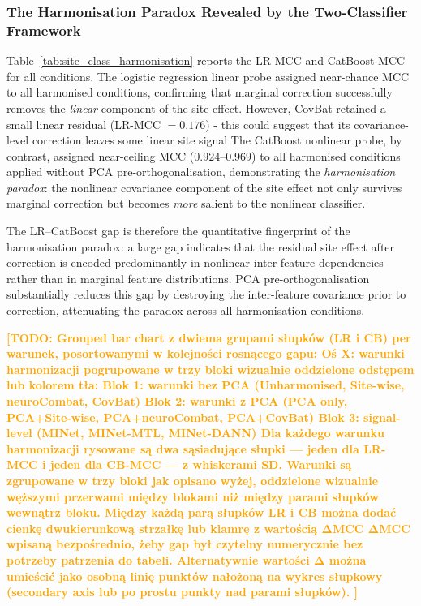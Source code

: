 \documentclass[preprint,12pt]{elsarticle}
\newcommand{\td}[1]{\textcolor{orange}{\textbf{[TODO: #1]}}}
\begin{document}
\subsubsection{The Harmonisation Paradox Revealed by the
  Two-Classifier Framework}
\label{subsubsec:paradox}

Table~\ref{tab:site_class_harmonisation} reports the LR-MCC and
CatBoost-MCC for all conditions.
The logistic regression linear probe assigned near-chance MCC to all
harmonised conditions, confirming that marginal correction
successfully removes the \emph{linear} component of the site effect. However, CovBat retained a small linear residual (LR-MCC $= 0.176$) - this could suggest that its covariance-level correction leaves some linear site signal
The CatBoost nonlinear probe, by contrast, assigned near-ceiling MCC
($0.924$--$0.969$) to all harmonised conditions applied without PCA
pre-orthogonalisation, demonstrating the \emph{harmonisation paradox}:
the nonlinear covariance component of the site effect not only
survives marginal correction but becomes \emph{more} salient to the
nonlinear classifier.

The LR--CatBoost gap is therefore the quantitative fingerprint of the harmonisation paradox: a large gap indicates that the residual site effect after correction is encoded predominantly in nonlinear inter-feature dependencies rather than in marginal feature distributions.
PCA pre-orthogonalisation substantially reduces this gap by
destroying the inter-feature covariance prior to correction,
attenuating the paradox across all harmonisation conditions.

\td{
Grouped bar chart z dwiema grupami słupków (LR i CB) per warunek, posortowanymi w kolejności rosnącego gapu:
Oś X: warunki harmonizacji pogrupowane w trzy bloki wizualnie oddzielone odstępem lub kolorem tła:
Blok 1: warunki bez PCA (Unharmonised, Site-wise, neuroCombat, CovBat)
Blok 2: warunki z PCA (PCA only, PCA+Site-wise, PCA+neuroCombat, PCA+CovBat)
Blok 3: signal-level (MINet, MINet-MTL, MINet-DANN)
Dla każdego warunku harmonizacji rysowane są dwa sąsiadujące słupki — jeden dla LR-MCC i jeden dla CB-MCC — z whiskerami SD. Warunki są zgrupowane w trzy bloki jak opisano wyżej, oddzielone wizualnie węższymi przerwami między blokami niż między parami słupków wewnątrz bloku.
Między każdą parą słupków LR i CB można dodać cienkę dwukierunkową strzałkę lub klamrę z wartością ΔMCC
ΔMCC wpisaną bezpośrednio, żeby gap był czytelny numerycznie bez potrzeby patrzenia do tabeli. Alternatywnie wartości Δ można umieścić jako osobną linię punktów nałożoną na wykres słupkowy (secondary axis lub po prostu punkty nad parami słupków).
}
\end{document}

